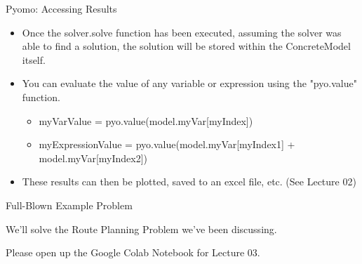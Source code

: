 \documentclass[10pt, aspectratio=169]{beamer}
\begin{document}
\begin{frame}{Pyomo: Accessing Results}
    \begin{itemize}
        \item Once the solver.solve function has been executed, assuming the solver was able to find a solution, the solution will be stored within the ConcreteModel itself.
        \item You can evaluate the value of any variable or expression using the "pyo.value" function.
        \begin{itemize}
            \item myVarValue = pyo.value(model.myVar[myIndex])
            \item myExpressionValue = pyo.value(model.myVar[myIndex1] + model.myVar[myIndex2])
        \end{itemize}
        \item These results can then be plotted, saved to an excel file, etc. (See Lecture 02)
    \end{itemize}
\end{frame}

\begin{frame}{Full-Blown Example Problem}
    \begin{center}
        We'll solve the Route Planning Problem we've been discussing.

        \vspace{1 cm}

        Please open up the Google Colab Notebook for Lecture 03.
    \end{center}
    
\end{frame}
\end{document}
